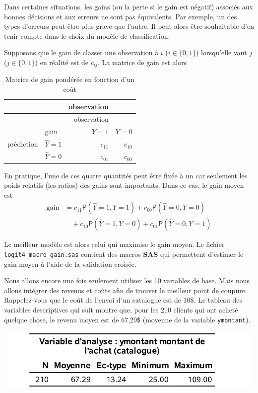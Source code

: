 \documentclass[
  11pt,
  letterpaper,
]{book}
\theoremstyle{definition}
\theoremstyle{definition}
\theoremstyle{definition}
\theoremstyle{definition}
\theoremstyle{remark}
\begin{document}
Dans certaines situations, les gains (ou la perte si le gain est négatif) associés aux bonnes décisions et aux erreurs ne sont pas équivalents. Par exemple, un des types d'erreurs peut être plus grave que l'autre. Il peut alors être souhaitable d'en tenir compte dans le choix du modèle de classification.

Supposons que le gain de classer une observation à \(i\) (\(i \in \{0,1\}\)) lorsqu'elle vaut \(j\) (\(j \in \{0,1\}\)) en réalité est de \(c_{ij}\). La matrice de gain est alors

\begin{longtable}[]{@{}llrr@{}}
\caption{\label{tab:03-gain2} Matrice de gain pondérée en fonction d'un coût}\tabularnewline
\toprule
& & observation & \\
\midrule
\endfirsthead
\toprule
& & observation & \\
\midrule
\endhead
& gain & \(Y=1\) & \(Y=0\) \\
prédiction & \(\widehat{Y}=1\) & \(c_{11}\) & \(c_{10}\) \\
& \(\widehat{Y}=0\) & \(c_{01}\) & \(c_{00}\) \\
\bottomrule
\end{longtable}

En pratique, l'une de ces quatre quantités peut être fixée à un car seulement les poids relatifs (les ratios) des gains sont importants. Dans ce cas, le gain moyen est
\begin{align*}
\text{gain} &= c_{11} {\mathsf P}\left(\widehat{Y}=1, Y=1\right) + c_{00}{\mathsf P}\left(\widehat{Y}=0, Y=0\right) 
\\ &\quad + c_{10} {\mathsf P}\left(\widehat{Y}=1, Y=0\right)  + c_{01} {\mathsf P}\left(\widehat{Y}=0, Y=1\right)
\end{align*}

Le meilleur modèle est alors celui qui maximise le gain moyen. Le fichier \texttt{logit4\_macro\_gain.sas} contient des macros \textbf{SAS} qui permettent d'estimer le gain moyen à l'aide de la validation croisée.

Nous allons encore une fois seulement utiliser les 10 variables de base. Mais nous allons intégrer des revenus et coûts afin de trouver le meilleur point de coupure. Rappelez-vous que le coût de l'envoi d'un catalogue est de 10\$. Le tableau des variables descriptives qui suit montre que, pour les 210 clients qui ont acheté quelque chose, le revenu moyen est de 67,29\$ (moyenne de la variable \texttt{ymontant}).

\begin{center}\includegraphics[width=0.6\linewidth]{figures/03-logistic-e18} \end{center}
\end{document}
